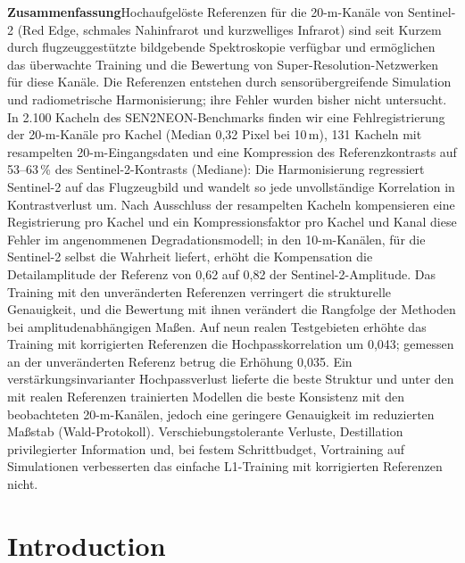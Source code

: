 \documentclass[pdflatex,sn-basic,referee,lineno]{sn-jnl}
\begin{document}
\maketitle

\noindent\textbf{Zusammenfassung}\quad Hochaufgelöste Referenzen für die 20-m-Kanäle von Sentinel-2 (Red Edge,
schmales Nahinfrarot und kurzwelliges Infrarot) sind seit Kurzem durch flugzeuggestützte bildgebende Spektroskopie
verfügbar und ermöglichen das überwachte Training und die Bewertung von Super-Resolution-Netzwerken für diese Kanäle.
Die Referenzen entstehen durch sensorübergreifende Simulation und radiometrische Harmonisierung; ihre Fehler wurden
bisher nicht untersucht. In 2.100 Kacheln des SEN2NEON-Benchmarks finden wir eine Fehlregistrierung der
20-m-Kanäle pro Kachel (Median 0,32 Pixel bei 10\,m), 131 Kacheln mit resampelten 20-m-Eingangsdaten und eine
Kompression des Referenzkontrasts auf 53--63\,\% des Sentinel-2-Kontrasts (Mediane): Die Harmonisierung regressiert
Sentinel-2 auf das Flugzeugbild und wandelt so jede unvollständige Korrelation in Kontrastverlust um. Nach Ausschluss
der resampelten Kacheln kompensieren eine Registrierung pro Kachel und ein Kompressionsfaktor pro Kachel und Kanal
diese Fehler im angenommenen Degradationsmodell; in den 10-m-Kanälen, für die Sentinel-2 selbst die Wahrheit
liefert, erhöht die Kompensation die Detailamplitude der Referenz von 0,62 auf 0,82 der Sentinel-2-Amplitude. Das Training mit
den unveränderten Referenzen verringert die strukturelle Genauigkeit, und die Bewertung mit ihnen verändert die
Rangfolge der Methoden bei amplitudenabhängigen Maßen. Auf neun realen Testgebieten erhöhte das Training mit
korrigierten Referenzen die Hochpasskorrelation um 0,043; gemessen an der unveränderten Referenz betrug die Erhöhung
0,035. Ein
verstärkungsinvarianter Hochpassverlust lieferte die beste Struktur und unter den mit realen Referenzen trainierten Modellen die beste
Konsistenz mit den beobachteten 20-m-Kanälen, jedoch eine geringere Genauigkeit im reduzierten Maßstab
(Wald-Protokoll). Verschiebungstolerante Verluste, Destillation privilegierter Information und, bei festem Schrittbudget, Vortraining auf
Simulationen verbesserten das einfache L1-Training mit korrigierten Referenzen nicht.

\section{Introduction}\label{sec:intro}
\end{document}
